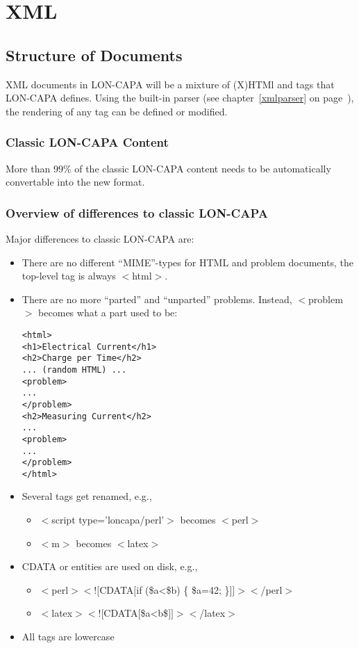 \chapter{XML}
\section{Structure of Documents}
XML documents in LON-CAPA will be a mixture of (X)HTMl and tags that LON-CAPA defines. Using the built-in parser (see chapter~\ref{xmlparser} on page~\pageref{xmlparser}), the rendering of any tag can be defined or modified.
\subsection{Classic LON-CAPA Content}
More than 99\% of the classic LON-CAPA content needs to be automatically convertable into the new format.
\subsection{Overview of differences to classic LON-CAPA}
Major differences to classic LON-CAPA are:
\begin{itemize}
\item There are no different ``MIME''-types for HTML and problem documents, the top-level tag is always $<$html$>$.
\item There are no more ``parted'' and ``unparted'' problems. Instead, $<$problem$>$ becomes what a part used to be:
\begin{verbatim}
<html>
<h1>Electrical Current</h1>
<h2>Charge per Time</h2>
... (random HTML) ...
<problem>
...
</problem>
<h2>Measuring Current</h2>
...
<problem>
...
</problem>
</html>
\end{verbatim}
\item Several tags get renamed, e.g.,
\begin{itemize}
\item $<$script type='loncapa/perl'$>$ becomes $<$perl$>$
\item $<$m$>$ becomes $<$latex$>$
\end{itemize}
\item CDATA or entities are used on disk, e.g.,
\begin{itemize}
\item $<$perl$><![$CDATA$[$if (\$a<\$b) \{ \$a=42; \}$]]><$/perl$>$
\item $<$latex$><![$CDATA$[$\$a<b\$$]]><$/latex$>$
\end{itemize}
\item All tags are lowercase
\end{itemize}

